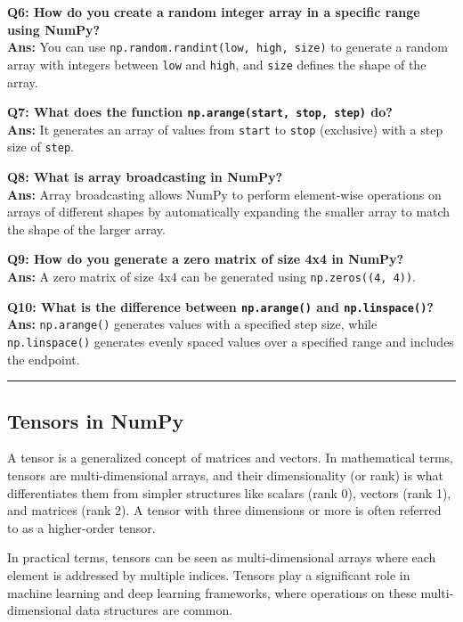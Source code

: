 \documentclass[
  letterpaper,
  DIV=11,
  numbers=noendperiod]{scrreprt}
\theoremstyle{plain}
\theoremstyle{definition}
\theoremstyle{remark}
\begin{document}
\textbf{Q6: How do you create a random integer array in a specific range
using NumPy?}\\
\textbf{Ans:} You can use \texttt{np.random.randint(low,\ high,\ size)}
to generate a random array with integers between \texttt{low} and
\texttt{high}, and \texttt{size} defines the shape of the array.

\textbf{Q7: What does the function
\texttt{np.arange(start,\ stop,\ step)} do?}\\
\textbf{Ans:} It generates an array of values from \texttt{start} to
\texttt{stop} (exclusive) with a step size of \texttt{step}.

\textbf{Q8: What is array broadcasting in NumPy?}\\
\textbf{Ans:} Array broadcasting allows NumPy to perform element-wise
operations on arrays of different shapes by automatically expanding the
smaller array to match the shape of the larger array.

\textbf{Q9: How do you generate a zero matrix of size 4x4 in NumPy?}\\
\textbf{Ans:} A zero matrix of size 4x4 can be generated using
\texttt{np.zeros((4,\ 4))}.

\textbf{Q10: What is the difference between \texttt{np.arange()} and
\texttt{np.linspace()}?}\\
\textbf{Ans:} \texttt{np.arange()} generates values with a specified
step size, while \texttt{np.linspace()} generates evenly spaced values
over a specified range and includes the endpoint.

\begin{center}\rule{0.5\linewidth}{0.5pt}\end{center}

\subsection{Tensors in NumPy}\label{tensors-in-numpy}

A tensor is a generalized concept of matrices and vectors. In
mathematical terms, tensors are multi-dimensional arrays, and their
dimensionality (or rank) is what differentiates them from simpler
structures like scalars (rank 0), vectors (rank 1), and matrices (rank
2). A tensor with three dimensions or more is often referred to as a
higher-order tensor.

In practical terms, tensors can be seen as multi-dimensional arrays
where each element is addressed by multiple indices. Tensors play a
significant role in machine learning and deep learning frameworks, where
operations on these multi-dimensional data structures are common.
\end{document}
